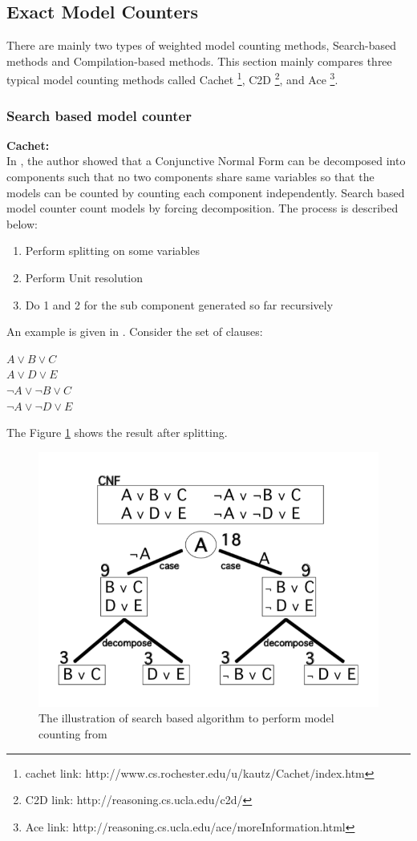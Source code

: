     \subsection{Exact Model Counters}
    There are mainly two types of weighted model counting methods, Search-based methods and Compilation-based methods. This section mainly compares three typical model counting methods called Cachet \footnote{cachet link: http://www.cs.rochester.edu/u/kautz/Cachet/index.htm}, C2D \footnote{C2D link: http://reasoning.cs.ucla.edu/c2d/}, and Ace \footnote{Ace link: http://reasoning.cs.ucla.edu/ace/moreInformation.html}.
    \subsubsection{Search based model counter}
    \textbf{Cachet:}\\
    In \cite{Bayardo:2000:CMU:647288.721114}, the author showed that a Conjunctive Normal Form can be decomposed into components such that no two components share same variables
    so that the models can be counted by counting each component independently.
    Search based model counter count models by forcing decomposition. The process is described below:
    \begin{enumerate}
        \item Perform splitting on some variables
        \item Perform Unit resolution
        \item Do 1 and 2 for the sub component generated so far recursively 
    \end{enumerate}
    An example is given in \cite{2008-literature-review}. Consider the set of clauses:\\
    \begin{center}
        $A \vee B \vee C$\\
        $A \vee D \vee E$\\
        $\neg A \vee \neg B \vee C$\\
        $\neg A \vee \neg D \vee E$\\
    \end{center}
    
    The Figure \ref{fig:searchfig} shows the result after splitting.
    
    \begin{figure}
        \centering
        \includegraphics[width = 0.5 \textwidth]{pic/searchalgo.png}
        \caption{The illustration of search based algorithm to perform model counting from \cite{2008-literature-review}}
        \label{fig:searchfig}
    \end{figure}
    
